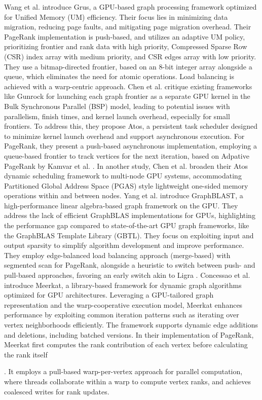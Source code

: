Wang et al. \cite{wang2021grus} introduce Grus, a GPU-based graph processing framework optimized for Unified Memory (UM) efficiency. Their focus lies in minimizing data migration, reducing page faults, and mitigating page migration overhead. Their PageRank implementation is push-based, and utilizes an adaptive UM policy, prioritizing frontier and rank data with high priority, Compressed Sparse Row (CSR) index array with medium priority, and CSR edges array with low priority. They use a bitmap-directed frontier, based on an 8-bit integer array alongside a queue, which eliminates the need for atomic operations. Load balancing is achieved with a warp-centric approach. Chen et al. \cite{chen2022atos} critique existing frameworks like Gunrock for launching each graph frontier as a separate GPU kernel in the Bulk Synchronous Parallel (BSP) model, leading to potential issues with parallelism, finish times, and kernel launch overhead, especially for small frontiers. To address this, they propose Atos, a persistent task scheduler designed to minimize kernel launch overhead and support asynchronous execution. For PageRank, they present a push-based asynchronous implementation, employing a queue-based frontier to track vertices for the next iteration, based on Adpative PageRank by Kamvar et al. \cite{kamvar2004adaptive}. In another study, Chen et al. \cite{chen2022scalable} broaden their Atos dynamic scheduling framework to multi-node GPU systems, accommodating Partitioned Global Address Space (PGAS) style lightweight one-sided memory operations within and between nodes. Yang et al. \cite{yang2022graphblast} introduce GraphBLAST, a high-performance linear algebra-based graph framework on the GPU. They address the lack of efficient GraphBLAS implementations for GPUs, highlighting the performance gap compared to state-of-the-art GPU graph frameworks, like the GraphBLAS Template Library (GBTL). They focus on exploiting input and output sparsity to simplify algorithm development and improve performance. They employ edge-balanced load balancing approach (merge-based) with segmented scan for PageRank, alongside a heuristic to switch between push- and pull-based approaches, favoring an early switch akin to Ligra \cite{shun2013ligra}. Concessao et al. \cite{concessao2023meerkat} introduce Meerkat, a library-based framework for dynamic graph algorithms optimized for GPU architectures. Leveraging a GPU-tailored graph representation and the warp-cooperative execution model, Meerkat enhances performance by exploiting common iteration patterns such as iterating over vertex neighborhoods efficiently. The framework supports dynamic edge additions and deletions, including batched versions. In their implementation of PageRank, Meerkat first computes the rank contribution of each vertex before calculating the rank itself. It employs a pull-based warp-per-vertex approach for parallel computation, where threads collaborate within a warp to compute vertex ranks, and achieves coalesced writes for rank updates.

